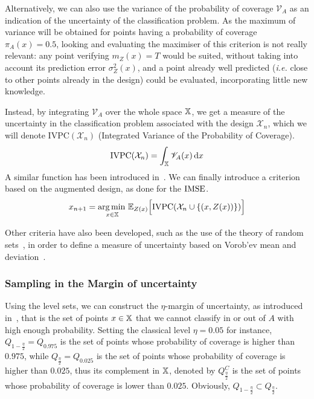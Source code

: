 \documentclass[../../Main_ManuscritThese.tex]{subfiles}
\begin{document}
Alternatively, we can also use the variance of the probability of
coverage $\mathscr{V}_A$ as an indication of the uncertainty of the
classification problem. As the maximum of variance will be obtained
for points having a probability of coverage $\pi_A(x) =0.5$, looking
and evaluating the maximiser of this criterion is not really relevant:
any point verifying $m_Z(x)=T$ would be suited, without taking into
account its prediction error $\sigma^2_Z(x)$, and a point already well
predicted (\emph{i.e.} close to other points already in the design)
could be evaluated, incorporating little new knowledge.


Instead, by integrating $\mathscr{V}_A$ over the whole space
$\mathbb{X}$, we get a measure of the uncertainty in the classification
problem associated with the design $\mathcal{X}_n$, which we will
denote $\mathrm{IVPC}(\mathcal{X}_n)$ (Integrated Variance of the
Probability of Coverage).
\begin{equation}
  \label{eq:IVPC_def}
\mathrm{IVPC}(\mathcal{X}_n) =  \int_{\mathbb{X}} \mathscr{V}_A(x)\,\mathrm{d}x
\end{equation}
A similar function has been introduced in~\cite{bect_sequential_2012}.
We can finally introduce a criterion based on the augmented design, as
done for the $\operatorname{\mathrm{IMSE}}$.
\begin{equation}
  \label{eq:expected_aIVPC}
  x_{n+1} = \operatorname*{arg\,min \,}_{x \in\mathbb{X}} \mathbb{E}_{Z(x)}\Big[\mathrm{IVPC}(\mathcal{X}_n \cup \{   \left(x, Z(x) \right)  \})\Big]
\end{equation}

Other criteria have also been developed, such as the use of the theory
of random sets~\citep{el_amri_data-driven_2019}, in order to define a
measure of uncertainty based on Vorob'ev mean and
deviation~\citep{vorobyev_new_2003}.


\subsubsection{Sampling in the Margin of uncertainty}
\label{sec:margin_of_uncertainty}

Using the level sets, we can construct the $\eta$-margin of
uncertainty, as introduced in~\cite{dubourg_reliability-based_2011},
that is the set of points $x \in \mathbb{X}$ that we cannot classify in
or out of $A$ with high enough probability.  Setting the classical
level $\eta=0.05$ for instance, $Q_{1-\frac{\eta}{2}}=Q_{0.975}$ is
the set of points whose probability of coverage is higher than
$0.975$, while $Q_{\frac{\eta}{2}}=Q_{0.025}$ is the set of points
whose probability of coverage is higher than $0.025$, thus its
complement in $\mathbb{X}$, denoted by $Q_{\frac{\eta}{2}}^C$ is the set
of points whose probability of coverage is lower than
$0.025$. Obviously, $Q_{1-\frac{\eta}{2}} \subset Q_{\frac{\eta}{2}}$.
\end{document}
